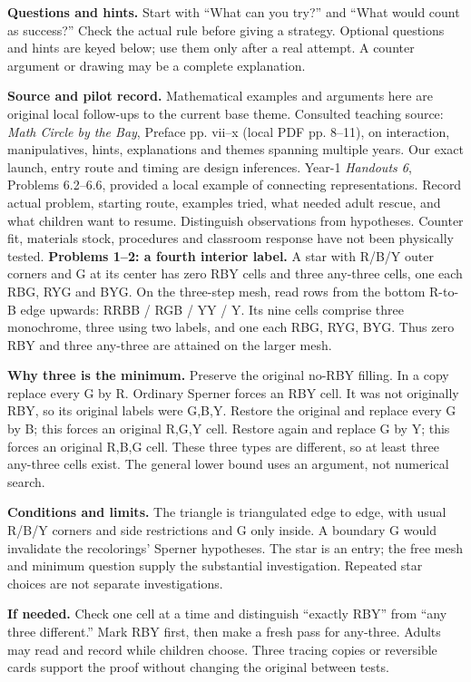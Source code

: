\documentclass[11pt]{article}
\begin{document}
\textbf{Questions and hints.} Start with ``What can you try?'' and ``What would count as success?'' Check the actual rule before giving a strategy. Optional questions and hints are keyed below; use them only after a real attempt. A counter argument or drawing may be a complete explanation.

\textbf{Source and pilot record.} Mathematical examples and arguments here are original local follow-ups to the current base theme. Consulted teaching source: \emph{Math Circle by the Bay}, Preface pp. vii--x (local PDF pp. 8--11), on interaction, manipulatives, hints, explanations and themes spanning multiple years. Our exact launch, entry route and timing are design inferences. Year-1 \emph{Handouts 6}, Problems 6.2--6.6, provided a local example of connecting representations. Record actual problem, starting route, examples tried, what needed adult rescue, and what children want to resume. Distinguish observations from hypotheses. Counter fit, materials stock, procedures and classroom response have not been physically tested.
\newpage
\textbf{Problems 1--2: a fourth interior label.} A star with R/B/Y outer corners and G at its center has zero RBY cells and three any-three cells, one each RBG, RYG and BYG. On the three-step mesh, read rows from the bottom R-to-B edge upwards: RRBB / RGB / YY / Y. Its nine cells comprise three monochrome, three using two labels, and one each RBG, RYG, BYG. Thus zero RBY and three any-three are attained on the larger mesh.

\textbf{Why three is the minimum.} Preserve the original no-RBY filling. In a copy replace every G by R. Ordinary Sperner forces an RBY cell. It was not originally RBY, so its original labels were G,B,Y. Restore the original and replace every G by B; this forces an original R,G,Y cell. Restore again and replace G by Y; this forces an original R,B,G cell. These three types are different, so at least three any-three cells exist. The general lower bound uses an argument, not numerical search.

\textbf{Conditions and limits.} The triangle is triangulated edge to edge, with usual R/B/Y corners and side restrictions and G only inside. A boundary G would invalidate the recolorings’ Sperner hypotheses. The star is an entry; the free mesh and minimum question supply the substantial investigation. Repeated star choices are not separate investigations.

\textbf{If needed.} Check one cell at a time and distinguish ``exactly RBY'' from ``any three different.'' Mark RBY first, then make a fresh pass for any-three. Adults may read and record while children choose. Three tracing copies or reversible cards support the proof without changing the original between tests.
\end{document}
